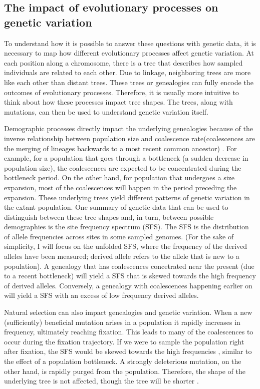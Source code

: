 \subsection{The impact of evolutionary processes on genetic variation}

To understand how it is possible to answer these questions with genetic data,
it is necessary to map how different evolutionary processes affect genetic variation.
At each position along a chromosome, there is a tree that describes how sampled individuals are related to each other.
Due to linkage, neighboring trees are more like each other than distant trees.
These trees or genealogies can fully encode the outcomes of evolutionary processes.
Therefore, it is usually more intuitive to think about how these processes impact tree shapes.
The trees, along with mutations, can then be used to understand genetic variation itself.

Demographic processes directly impact the underlying genealogies because of the inverse relationship between population size and coalescence rate(coalescences are the merging of lineages backwards to a most recent common ancestor) \citep{wakely_coalescent_2016}.
For example, for a population that goes through a bottleneck (\ie a sudden decrease in population size),
the coalescences are expected to be concentrated during the bottleneck period.
On the other hand, for population that undergoes a size expansion,
most of the coalescences will happen in the period preceding the expansion.
These underlying trees yield different patterns of genetic variation in the extant population.
One summary of genetic data that can be used to distinguish between these tree shapes and, in turn, between possible demographies is the site frequency spectrum (SFS).
The SFS is the distribution of allele frequencies across sites in some sampled genomes.
(For the sake of simplicity, I will focus on the unfolded SFS, where the frequency of the derived alleles have been measured; derived allele refers to the allele that is new to a population).
A genealogy that has coalescences concetrated near the present (due to a recent bottleneck) will yield a SFS that is skewed towards the high frequency of derived alleles.
Conversely, a genealogy with coalescences happening earlier on will yield a SFS with an excess of low frequency derived alleles.

Natural selection can also impact genealogies and genetic variation.
When a new (sufficiently) beneficial mutation arises in a population it rapidly increases in frequency, ultimately reaching fixation.
This leads to many of the coalescences to occur during the fixation trajectory.
If we were to sample the population right after fixation,
the SFS would be skewed towards the high frequencies \citep{kim_allele_2006}, similar to the effect of a population bottleneck.
A strongly deleterious mutation, on the other hand, is rapidly purged from the population.
Therefore, the shape of the underlying tree is not affected, though the tree will be shorter \citep{williamson_genealogy_2002, barton_effect_2004}.

